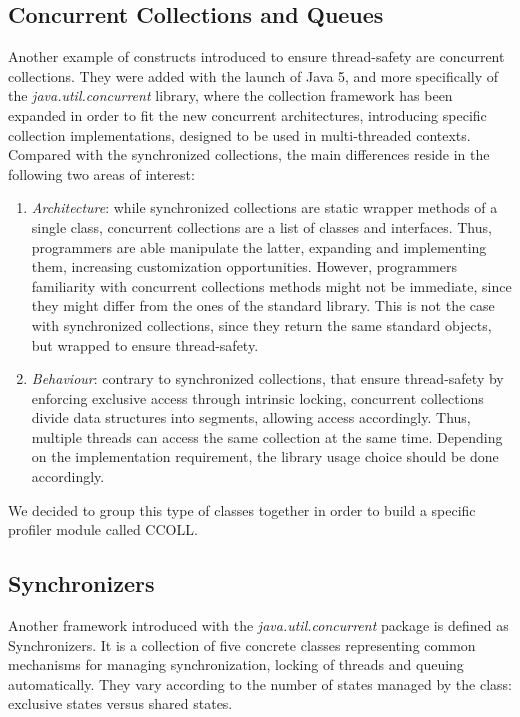 \documentclass[]{usiinfthesis}
\begin{document}
\subsection{Concurrent Collections and Queues}
Another example of constructs introduced to ensure thread-safety are concurrent collections. They were added with the launch of Java 5, and more specifically of the \textit{java.util.concurrent} library, where the collection framework has been expanded in order to fit the new concurrent architectures, introducing specific collection implementations, designed to be used in multi-threaded contexts. Compared with the synchronized collections, the main differences reside in the following two areas of interest:
\begin{enumerate}
    \item \textit{Architecture}: while synchronized collections are static wrapper methods of a single class, concurrent collections are a list of classes and interfaces. Thus, programmers are able manipulate the latter, expanding and implementing them, increasing customization opportunities. However, programmers familiarity with concurrent collections methods might not be immediate, since they might differ from the ones of the standard library. This is not the case with synchronized collections, since they return the same standard objects, but wrapped to ensure thread-safety.  
    \item \textit{Behaviour}: contrary to synchronized collections, that ensure thread-safety by enforcing exclusive access through intrinsic locking, concurrent collections divide data structures into segments, allowing access accordingly. Thus, multiple threads can access the same collection at the same time. Depending on the implementation requirement, the library usage choice should be done accordingly.
\end{enumerate}

\noindent
We decided to group this type of classes together in order to build a specific profiler module called CCOLL.


\subsection{Synchronizers}
Another framework introduced with the \textit{java.util.concurrent} package is defined as Synchronizers. It is a collection of five concrete classes representing common mechanisms for managing synchronization, locking of threads and queuing automatically. They vary according to the number of states managed by the class: exclusive states versus shared states.
\end{document}
